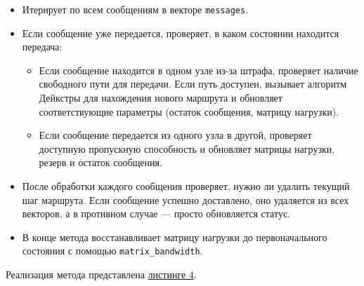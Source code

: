 \documentclass[11pt,a4paper,final]{article} %
\begin{document}
\begin{itemize}
	\item Итерирует по всем сообщениям в векторе \texttt{messages}.
	\item Если сообщение уже передается, проверяет, в каком состоянии находится передача:
	\begin{itemize}
		\item Если сообщение находится в одном узле из-за штрафа, проверяет наличие свободного пути для передачи. Если путь доступен, вызывает алгоритм Дейкстры для нахождения нового маршрута и обновляет соответствующие параметры (остаток сообщения, матрицу нагрузки).
		\item Если сообщение передается из одного узла в другой, проверяет доступную пропускную способность и обновляет матрицы нагрузки, резерв и остаток сообщения.
	\end{itemize}
	\item После обработки каждого сообщения проверяет, нужно ли удалить текущий шаг маршрута. Если сообщение успешно доставлено, оно удаляется из всех векторов, а в противном случае — просто обновляется статус.
	\item В конце метода восстанавливает матрицу нагрузки до первоначального состояния с помощью \texttt{matrix\_bandwidth}.
\end{itemize}

Реализация метода представлена \hyperref[lst4]{листинге 4}.
\end{document}
